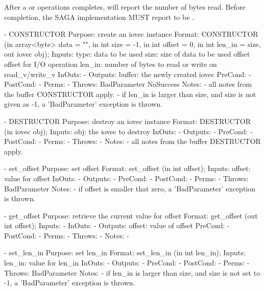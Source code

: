     After a  or  operations
    completes,  will report the number of bytes
    read.  Before completion, the SAGA implementation MUST
    report  to be .
 
 
 \begin{myspec}
    - CONSTRUCTOR
      Purpose:  create an iovec instance
      Format:   CONSTRUCTOR     (in  array<byte> data   = "",
                                 in  int         size   = -1,
                                 in  int         offset = 0,
                                 in  int         len_in = size,
                                 out iovec       obj);
      Inputs:   type:                 data to be used
                size:                 size of data to be used
                offset                offset for I/O operation
                len_in:               number of bytes to read
                                      or write on read_v/write_v
      InOuts:   -
      Outputs:  buffer:               the newly created iovec 
      PreCond:  -
      PostCond: -
      Perms:    - 
      Throws:   BadParameter
                NoSuccess
      Notes:    - all notes from the buffer CONSTRUCTOR apply.
                - if len_in is larger than size, and size is 
                  not given as -1, a 'BadParameter' exception 
                  is thrown.
 
    - DESTRUCTOR
      Purpose:  destroy an iovec instance
      Format:   DESTRUCTOR           (in  iovec obj);
      Inputs:   obj:                  the iovec to destroy
      InOuts:   -
      Outputs:  -
      PreCond:  -
      PostCond: -
      Perms:    - 
      Throws:   - 
      Notes:    - all notes from the buffer DESTRUCTOR apply.
 
    - set_offset
      Purpose:  set offset
      Format:   set_offset           (in  int   offset);
      Inputs:   offset:               value for offset
      InOuts:   -
      Outputs:  -
      PreCond:  -
      PostCond: -
      Perms:    - 
      Throws:   BadParameter
      Notes:    - if offset is smaller that zero, a 
                  'BadParameter' exception is thrown.
 
    - get_offset
      Purpose:  retrieve the current value for offset
      Format:   get_offset           (out int   offset);
      Inputs:   -
      InOuts:   -
      Outputs:  offset:               value of offset
      PreCond:  -
      PostCond: -
      Perms:    - 
      Throws:   -
      Notes:    -
 
    - set_len_in
      Purpose:  set len_in
      Format:   set_len_in           (in  int   len_in);
      Inputs:   len_in:               value for len_in
      InOuts:   -
      Outputs:  -
      PreCond:  -
      PostCond: -
      Perms:    - 
      Throws:   BadParameter
      Notes:    - if len_in is larger than size, and size is 
                  not set to -1, a 'BadParameter' exception 
                  is thrown.
 

\end{myspec}
